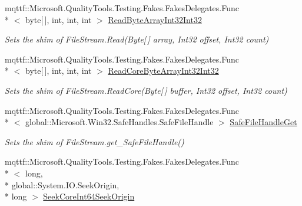 \begin{DoxyCompactItemize}
mqttf\-::\-Microsoft.\-Quality\-Tools.\-Testing.\-Fakes.\-Fakes\-Delegates.\-Func\\*
$<$ byte\mbox{[}$\,$\mbox{]}, int, int, int $>$ \hyperlink{class_system_1_1_i_o_1_1_fakes_1_1_shim_file_stream_a97353d69e4c0ef200c27247815622c7b}{Read\-Byte\-Array\-Int32\-Int32}
\begin{DoxyCompactList}\small\item\em Sets the shim of File\-Stream.\-Read(\-Byte\mbox{[}$\,$\mbox{]} array, Int32 offset, Int32 count)\end{DoxyCompactList}\item 
mqttf\-::\-Microsoft.\-Quality\-Tools.\-Testing.\-Fakes.\-Fakes\-Delegates.\-Func\\*
$<$ byte\mbox{[}$\,$\mbox{]}, int, int, int $>$ \hyperlink{class_system_1_1_i_o_1_1_fakes_1_1_shim_file_stream_ab46ef0a882637a9a499f8ef88d00b650}{Read\-Core\-Byte\-Array\-Int32\-Int32}
\begin{DoxyCompactList}\small\item\em Sets the shim of File\-Stream.\-Read\-Core(\-Byte\mbox{[}$\,$\mbox{]} buffer, Int32 offset, Int32 count)\end{DoxyCompactList}\item 
mqttf\-::\-Microsoft.\-Quality\-Tools.\-Testing.\-Fakes.\-Fakes\-Delegates.\-Func\\*
$<$ global\-::\-Microsoft.\-Win32.\-Safe\-Handles.\-Safe\-File\-Handle $>$ \hyperlink{class_system_1_1_i_o_1_1_fakes_1_1_shim_file_stream_aaf854ff8a4f3e133fc50a6eb064569dc}{Safe\-File\-Handle\-Get}
\begin{DoxyCompactList}\small\item\em Sets the shim of File\-Stream.\-get\-\_\-\-Safe\-File\-Handle()\end{DoxyCompactList}\item 
mqttf\-::\-Microsoft.\-Quality\-Tools.\-Testing.\-Fakes.\-Fakes\-Delegates.\-Func\\*
$<$ long, \\*
global\-::\-System.\-I\-O.\-Seek\-Origin, \\*
long $>$ \hyperlink{class_system_1_1_i_o_1_1_fakes_1_1_shim_file_stream_a9ce54c4a516597227a09f057df6d4328}{Seek\-Core\-Int64\-Seek\-Origin}

\end{DoxyCompactItemize}
